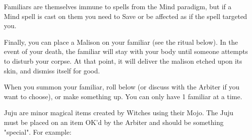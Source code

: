 {Familiars are themselves immune to spells from the Mind paradigm, but if a Mind spell is cast on them you need to Save or be affected as if the spell targeted you.

Finally,  you can place a Malison on your familiar (see the ritual below).  In the event of your death, the familiar will stay with your body until someone attempts to disturb your corpse.  At that point, it will deliver the malison etched upon its skin, and dismiss itself for good.

When you summon your familiar, roll below (or discuss with the Arbiter if you want to choose), or make something up.  You can only have 1 familiar at a time.






\OCCULT[
  Name=Create Juju,
  Link=occultism-create-juju,
  Success=varies,
  Cost=See below,
  Widdershins=0
]


Juju are minor magical items created by Witches using their Mojo.  The Juju must be placed on an item OK'd by the Arbiter and should be something "special".  For example:

}
